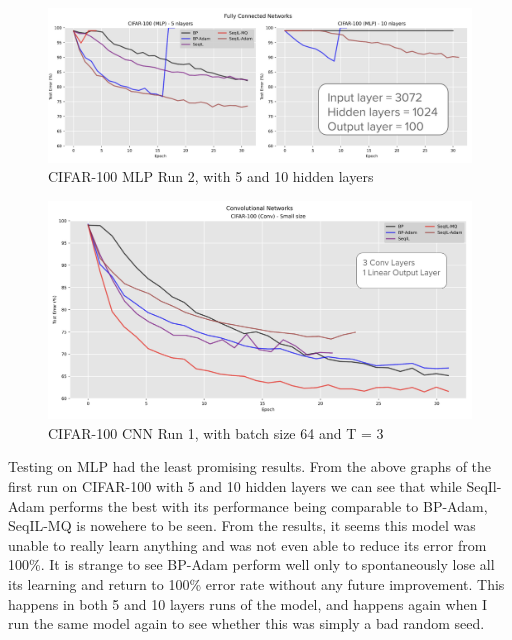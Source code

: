\documentclass{article}
\theoremstyle{plain}
\theoremstyle{definition}
\theoremstyle{remark}
\begin{document}
\begin{figure}[t]
    \centering
    \includegraphics[width=\textwidth]{images/cifar_mlp_2.png} %
    \caption{CIFAR-100 MLP Run 2, with 5 and 10 hidden layers}
\end{figure}

\begin{figure}[ht]
    \centering
    \includegraphics[width=\columnwidth]{images/cifar_conv_run1.png} %
    \caption{CIFAR-100 CNN Run 1, with batch size 64 and T = 3}
\end{figure}

Testing on MLP had the least promising results. From the above graphs of the 
first run on CIFAR-100 with 5 and 10 hidden layers we can see that while SeqIl-Adam performs the 
best with its performance being comparable to BP-Adam, SeqIL-MQ is nowehere to be seen. From the results,
it seems this model was unable to really learn anything and was not even able to reduce its error from 100\%.
It is strange to see BP-Adam perform well only to spontaneously lose all its learning and return to 
100\% error rate without any future improvement. This happens in both 5 and 10 layers runs of the model, and 
happens again when I run the same model again to see whether this was simply a bad random seed. 
\end{document}
